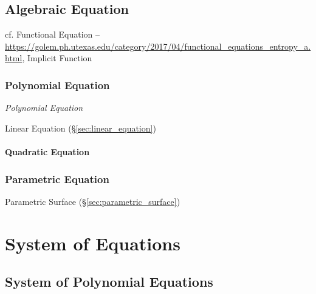 \subsection{Algebraic Equation}\label{sec:algebraic_equation}

cf. Functional Equation --
\url{https://golem.ph.utexas.edu/category/2017/04/functional_equations_entropy_a.html},
Implicit Function %



\subsubsection{Polynomial Equation}\label{sec:polynomial_equation}

\emph{Polynomial Equation}

Linear Equation (\S\ref{sec:linear_equation})



\paragraph{Quadratic Equation}\label{sec:quadratic_equation}\hfill



\subsubsection{Parametric Equation}\label{sec:parametric_equation}


Parametric Surface (\S\ref{sec:parametric_surface})



\section{System of Equations}\label{sec:system_of_equations}

\subsection{System of Polynomial Equations}
\label{sec:system_of_polynomials}

